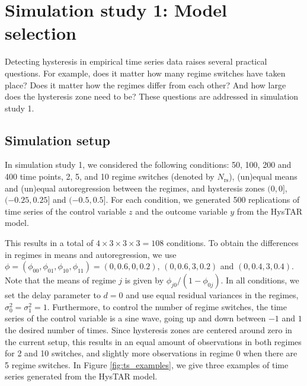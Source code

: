 \documentclass{article}
\begin{document}
\section{Simulation study 1: Model selection}
\label{sec:simulation_study_1}
Detecting hysteresis in empirical time series data raises several practical questions.
For example, does it matter how many regime switches have taken place?
Does it matter how the regimes differ from each other?
And how large does the hysteresis zone need to be?
These questions are addressed in simulation study 1.

\subsection{Simulation setup}
In simulation study 1, we considered the following conditions: 50, 100, 200 and 400 time points, 2, 5, and 10 regime switches (denoted by $N_{\mathrm{rs}}$), (un)equal means and (un)equal autoregression between the regimes, and hysteresis zones $(0, 0]$, $(-0.25, 0.25]$ and $(-0.5, 0.5]$. For each condition, we generated 500 replications of time series of the control variable $z$ and the outcome variable $y$ from the HysTAR model.

This results in a total of $4 \times 3 \times 3 \times 3 = 108$ conditions.
To obtain the differences in regimes in means and autoregression, we use $\phi = (\phi_{00}, \phi_{01}, \phi_{10}, \phi_{11}) = (0, 0.6, 0, 0.2)$, $(0, 0.6, 3, 0.2)$ and $(0, 0.4, 3, 0.4)$. Note that the means of regime $j$ is given by $\phi_{j0}/(1 - \phi_{0j})$.
In all conditions, we set the delay parameter to $d = 0$ and use equal residual variances in the regimes, $\sigma_0^2 = \sigma_1^2 = 1$. 
Furthermore, to control the number of regime switches, the time series of the control variable is a sine wave, going up and down between $-1$ and $1$ the desired number of times.
Since hysteresis zones are centered around zero in the current setup, this results in an equal amount of observations in both regimes for 2 and 10 switches, and slightly more observations in regime 0 when there are 5 regime switches.
In Figure \ref{fig:ts_examples}, we give three examples of time series generated from the HysTAR model.
\end{document}

